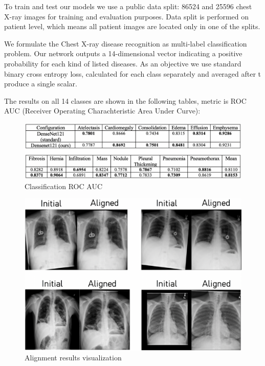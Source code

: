 \documentclass{article}
\begin{document}
To train and test our models we use a public data split: 86524 and 25596 chest 
X-ray images for training and evaluation purposes. Data split is performed on 
patient level, which means all patient images are located only in one of the 
splits.

We formulate the Chest X-ray disease recognition as multi-label classification 
problem. Our network outputs a 14-dimensional vector indicating a positive 
probability for each kind of listed diseases. As an objective we use standard 
binary cross entropy loss, calculated for each class separately and averaged 
after t produce a single scalar.

The results on all 14 classes are shown in the following tables, metric is 
ROC AUC (Receiver Operating Charachteristic Area Under Curve):

\begin{figure}[ht]\label{classification}
    \vskip 0.2in
    \begin{center}
    \centerline{\includegraphics[width=\columnwidth * 2]{../images/classification.png}}
    \caption{Classification ROC AUC}
    \end{center}
    \vskip -0.2in
\end{figure}

\begin{figure}[ht]\label{visualization}
    \vskip 0.2in
    \begin{center}
    \centerline{\includegraphics[width=\columnwidth]{../images/alignment_results.png}}
    \caption{Alignment results visualization}
    \end{center}
    \vskip -0.2in
\end{figure}
\end{document}
